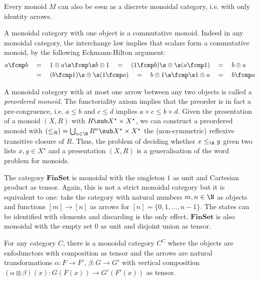 \begin{example}
Every monoid $M$ can also be seen as a discrete monoidal category, i.e. with only identity arrows.
\end{example}

\begin{example}
A monoidal category with one object is a commutative monoid.
Indeed in any monoidal category, the interchange law implies that scalars form a commutative monoid, by the following Eckmann-Hilton argument:
\begin{align*}
a \fcmp b
&\quad = \quad 1 \otimes a \s \fcmp \s b \otimes 1
\quad = \quad (1 \fcmp b) \s \otimes \s (a \fcmp 1)
\quad = \quad b \otimes a
\\
&\quad = \quad (b \fcmp 1) \s \otimes \s (1 \fcmp a)
\quad = \quad b \otimes 1 \s \fcmp \s 1 \otimes a
\quad = \quad b \fcmp a
\end{align*}
\end{example}

\begin{example}
A monoidal category with at most one arrow between any two objects is called a \emph{preordered monoid}.
The functoriality axiom implies that the preorder is in fact a pre-congruence, i.e. $a \leq b$ and $c \leq d$ implies $a \times c \leq b \times d$.
Given the presentation of a monoid $(X, R)$ with $R \sub X^\star \times X^\star$, we can construct a preordered monoid with $(\leq_R) = \bigcup_{n \in \N} R^n \sub X^\star \times X^\star$ the (non-symmetric) reflexive transitive closure of $R$.
Thus, the problem of deciding whether $x \leq_\R y$ given two lists $x, y \in X^\star$ and a presentation $(X, R)$ is a generalisation of the word problem for monoids.
\end{example}

\begin{example}
The category $\mathbf{FinSet}$ is monoidal with the singleton $1$ as unit and Cartesian product as tensor.
Again, this is not a strict monoidal category but it is equivalent to one: take the category with natural numbers $m, n \in \N$ as objects and functions $[m] \to [n]$ as arrows for $[n] = \{ 0, 1, \dots, n - 1 \}$.
The states can be identified with elements and discarding is the only effect.
$\mathbf{FinSet}$ is also monoidal with the empty set $0$ as unit and disjoint union as tensor.
\end{example}

\begin{example}
For any category $C$, there is a monoidal category $C^C$ where the objects are enfodunctors with composition as tensor and the arrows are natural transformations $\alpha : F \to F'$, $\beta : G \to G'$ with vertical composition $(\alpha \otimes \beta)(x) : G(F(x)) \to G'(F'(x))$ as tensor.
\end{example}

